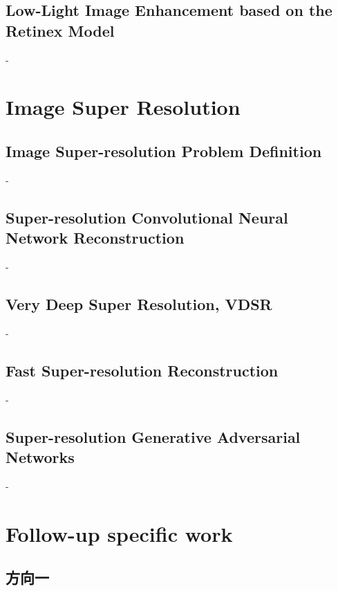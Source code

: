 \documentclass[letterpaper,10pt]{article}
\begin{document}
	
		\subsection{Low-Light Image Enhancement based on the Retinex Model}
		
		-
	
	\section{Image Super Resolution}
	
		\subsection{Image Super-resolution Problem Definition}
		
		-
		
		\subsection{Super-resolution Convolutional Neural Network Reconstruction}
		
		-
		
		\subsection{Very Deep Super Resolution, VDSR}
		
		-
		
		\subsection{Fast Super-resolution Reconstruction}
		
		-
		
		\subsection{Super-resolution Generative Adversarial Networks}
		
		-
	
	\section{Follow-up specific work}
	
		\subsection{方向一}
		
\end{document}
